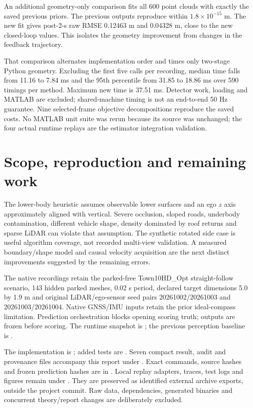 \documentclass[11pt]{article}
\begin{document}
An additional geometry-only comparison fits all 600 point clouds with exactly
the saved previous priors. The previous outputs reproduce within
$1.8\times10^{-15}$ m. The new fit gives post-2-s raw RMSE 0.12463 m and
0.04328 m, close to the new closed-loop values. This isolates the geometry
improvement from changes in the feedback trajectory.

That comparison alternates implementation order and times only two-stage
Python geometry. Excluding the first five calls per recording, median time
falls from 11.16 to 7.84 ms and the 95th percentile from 31.85 to 18.86 ms
over 590 timings per method. Maximum new time is 37.51 ms. Detector work,
loading and MATLAB are excluded; shared-machine timing is not an end-to-end
50 Hz guarantee. Nine selected-frame objective decompositions reproduce the
saved costs. No MATLAB unit suite was rerun because its source was unchanged;
the four actual runtime replays are the estimator integration validation.

\section{Scope, reproduction and remaining work}
The lower-body heuristic assumes observable lower surfaces and an ego
$z$ axis approximately aligned with vertical. Severe occlusion, sloped roads,
underbody contamination, different vehicle shape, density dominated by roof
returns and sparse LiDAR can violate that assumption. The synthetic rotated
side case is useful algorithm coverage, not recorded multi-view validation.
A measured boundary/shape model and causal velocity acquisition are the next
distinct improvements suggested by the remaining errors.

The native recordings retain the parked-free Town10HD\_Opt straight-follow
scenario, 143 hidden parked meshes, 0.02 s period, declared target dimensions
5.0 by 1.9 m and original LiDAR/ego-sensor seed pairs
20261002/20261003 and 20261003/20261004. Native GNSS/IMU inputs retain the
prior ideal-compass limitation. Prediction orchestration blocks opening
scoring truth; outputs are frozen before scoring. The runtime snapshot is
; the previous perception
baseline is .

The implementation is ; added tests are
. Seven compact result, audit and
provenance files accompany this report under
.
Exact commands, source hashes and frozen prediction hashes are in
. Local replay adapters, traces, test logs and figures
remain under .
They are preserved as identified external archive exports, outside the
project commit. Raw data, dependencies, generated binaries and concurrent
theory/report changes are deliberately excluded.
\end{document}
